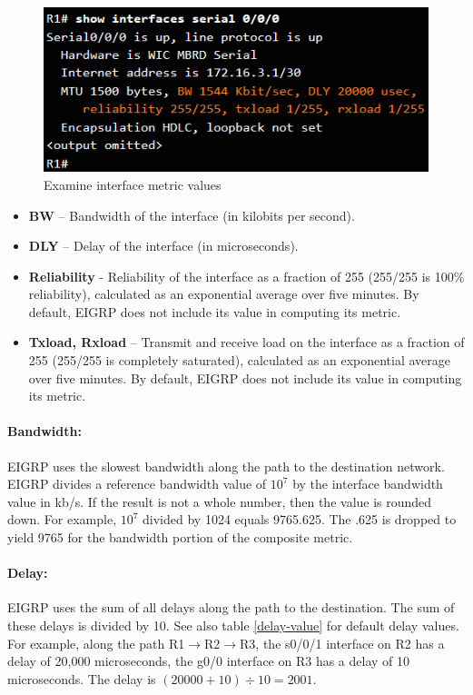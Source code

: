 \begin{figure}[hbtp]
\caption{Examine interface metric values}\label{EIGRPmetric}
\centering
\includegraphics[scale=0.8]{pictures/EIGRPmetric.PNG}
\end{figure}

\begin{itemize}
\item \textbf{BW} -- Bandwidth of the interface (in kilobits per second).
\item \textbf{DLY} -- Delay of the interface (in microseconds).
\item \textbf{Reliability} - Reliability of the interface as a fraction of 255 (255/255 is 100\% reliability), calculated as an exponential average over five minutes. By default, EIGRP does not include its value in computing its metric.
\item \textbf{Txload, Rxload} -- Transmit and receive load on the interface as a fraction of 255 (255/255 is completely saturated), calculated as an exponential average over five minutes. By default, EIGRP does not include its value in computing its metric.
\end{itemize}

\paragraph{Bandwidth:} EIGRP uses the slowest bandwidth along the path to the destination network. EIGRP divides a reference bandwidth value of $10^7$ by the interface bandwidth value in kb/s. If the result is not a whole number, then the value is rounded down. For example, $10^7$ divided by 1024 equals 9765.625. The .625 is dropped to yield 9765 for the bandwidth portion of the composite metric.

\paragraph{Delay:} EIGRP uses the sum of all delays along the path to the destination. The sum of these delays is divided by 10. See also table \ref{delay-value} for default delay values. For example, along the path R1$\rightarrow$R2$\rightarrow$R3, the s0/0/1 interface on R2 has a delay of 20,000 microseconds, the g0/0 interface on R3 has a delay of 10 microseconds. The delay is $ \left( 20000 + 10 \right) \div 10 = 2001 $.

